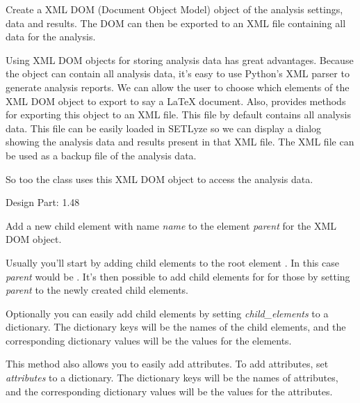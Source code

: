 \documentclass[letterpaper,10pt,english]{sphinxmanual}
\begin{document}
\begin{fulllineitems}
\label{setlyze/std:setlyze.std.ReportGenerator}
Create a XML DOM (Document Object Model) object of the analysis
settings, data and results. The DOM can then be exported to an XML
file containing all data for the analysis.

Using XML DOM objects for storing analysis data has great
advantages. Because the object can contain all analysis data, it's
easy to use Python's XML parser to generate analysis reports. We can
allow the user to choose which elements of the XML DOM object to
export to say a LaTeX document. Also, \href{http://docs.python.org/library/xml.dom.minidom.html\#module-xml.dom.minidom}{}
provides methods for exporting this object to an XML file. This file
by default contains all analysis data. This file can be easily
loaded in SETLyze so we can display a dialog showing the analysis
data and results present in that XML file. The XML file can be used
as a backup file of the analysis data.

So too the class {\hyperref[setlyze/std:setlyze.std.ReportReader]{}} uses this XML DOM object
to access the analysis data.

Design Part: 1.48

\begin{fulllineitems}
\label{setlyze/std:setlyze.std.ReportGenerator.create_element}
Add a new child element with name \emph{name} to the element
\emph{parent} for the XML DOM object.

Usually you'll start by adding child elements to the
root element . In this case \emph{parent} would be
. It's then possible to add child elements for
for those by setting \emph{parent} to the newly created child
elements.

Optionally you can easily add child elements by setting
\emph{child\_elements} to a dictionary. The dictionary keys will be
the names of the child elements, and the corresponding
dictionary values will be the values for the elements.

This method also allows you to easily add attributes. To add
attributes, set \emph{attributes} to a dictionary. The dictionary
keys will be the names of attributes, and the corresponding
dictionary values will be the values for the attributes.


\end{fulllineitems}
\end{fulllineitems}
\end{document}
